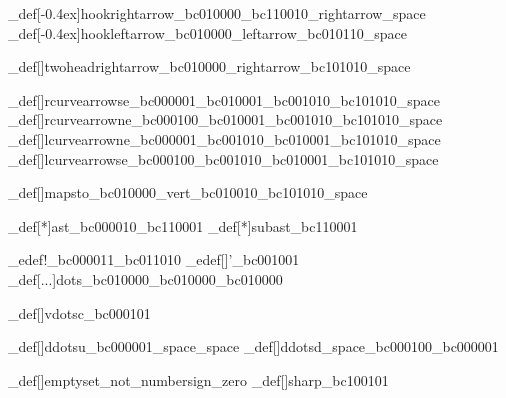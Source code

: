 \brl@char_def[\kern-0.4ex]{hookrightarrow}{\brl@char_bc010000\brl@char_bc110010\brl@char@alias_rightarrow\brl@char@alias_space}
\brl@char_def[\kern-0.4ex]{hookleftarrow}{\brl@char_bc010000\brl@char@alias_leftarrow\brl@char_bc010110\brl@char@alias_space}

\brl@char_def[]{twoheadrightarrow}{\brl@char_bc010000\brl@char@alias_rightarrow\brl@char_bc101010\brl@char@alias_space}


\brl@char_def[\brl@orig@rcurvearrowse]{rcurvearrowse}{\brl@char_bc000001\brl@char_bc010001\brl@char_bc001010\brl@char_bc101010\brl@char@alias_space}
\brl@char_def[\brl@orig@rcurvearrowne]{rcurvearrowne}{\brl@char_bc000100\brl@char_bc010001\brl@char_bc001010\brl@char_bc101010\brl@char@alias_space}
\brl@char_def[\brl@orig@lcurvearrowne]{lcurvearrowne}{\brl@char_bc000001\brl@char_bc001010\brl@char_bc010001\brl@char_bc101010\brl@char@alias_space}
\brl@char_def[\brl@orig@lcurvearrowse]{lcurvearrowse}{\brl@char_bc000100\brl@char_bc001010\brl@char_bc010001\brl@char_bc101010\brl@char@alias_space}

\brl@char_def[]{mapsto}{\brl@char_bc010000\brl@char@alias_vert\brl@char_bc010010\brl@char_bc101010\brl@char@alias_space}










\brl@char_def[*]{ast}{\brl@char_bc000010\brl@char_bc110001}
\brl@char_def[*]{subast}{\brl@char_bc110001}

\brl@char_edef{!}{\brl@char_bc000011\brl@char_bc011010}
\brl@char_edef[]{'}{\brl@char_bc001001}
\brl@char_def[...]{dots}{\brl@char_bc010000\brl@char_bc010000\brl@char_bc010000}

\brl@char_def[\brl@char@vdots]{vdotsc}{\brl@char_bc000101}

\brl@char_def[\brl@char@ddots]{ddotsu}{\brl@char_bc000001\brl@char@alias_space\brl@char@alias_space}
\brl@char_def[\brl@char@ddots]{ddotsd}{\brl@char@alias_space\brl@char_bc000100\brl@char_bc000001}

\brl@char_def[]{emptyset}{\brl@char@alias_not\brl@char@alias_numbersign\brl@char@alias_zero}
\brl@char_def[]{sharp}{\brl@char_bc100101}

